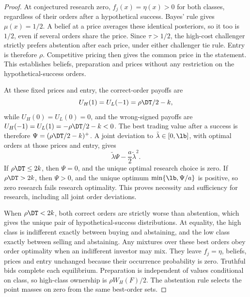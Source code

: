 \begin{proof}
At conjectured research zero, \(f_j(x)=\eta(x)>0\) for both classes, regardless of their orders after a
hypothetical success. Bayes' rule gives \(\mu(x)=1/2\). A belief at a price averages these identical posteriors,
so it too is \(1/2\), even if several orders share the price. Since \(\tau>1/2\), the high-cost challenger
strictly prefers abstention after each price, under either challenger tie rule. Entry is therefore \(\rho\).
Competitive pricing then gives the common price in the statement. This establishes beliefs, preparation and
prices without any restriction on the hypothetical-success orders.

At these fixed prices and entry, the correct-order payoffs are
\[
 U_H(1)=U_L(-1)=\rho\DT/2-k,
\]
while \(U_H(0)=U_L(0)=0\), and the wrong-signed payoffs are
\(U_H(-1)=U_L(1)=-\rho\DT/2-k<0\). The best trading value after a success is therefore
\(\Psi=(\rho\DT/2-k)^+\). A joint deviation to \(\tilde\lambda\in[0,\lb]\), with optimal orders at those
prices and entry, gives
\[
 \tilde\lambda\Psi-\frac a2\tilde\lambda^2.
\]
If \(\rho\DT\le2k\), then \(\Psi=0\), and the unique optimal research choice is zero. If \(\rho\DT>2k\),
then \(\Psi>0\), and the unique optimum \(\min\{\lb,\Psi/a\}\) is positive, so zero research fails research
optimality. This proves necessity and sufficiency for research, including all joint order deviations.

When \(\rho\DT<2k\), both correct orders are strictly worse than abstention, which gives the unique pair of
hypothetical-success distributions. At equality, the high class is indifferent exactly between buying and
abstaining, and the low class exactly between selling and abstaining. Any mixtures over these best orders obey
order optimality when an indifferent investor may mix. They leave \(f_j=\eta\), beliefs, prices and entry
unchanged because their occurrence probability is zero. Truthful bids complete each equilibrium. Preparation
is independent of values conditional on class, so high-class ownership is \(\rho W_H(F)/2\). The abstention
rule selects the point masses on zero from the same best-order sets.
\end{proof}

